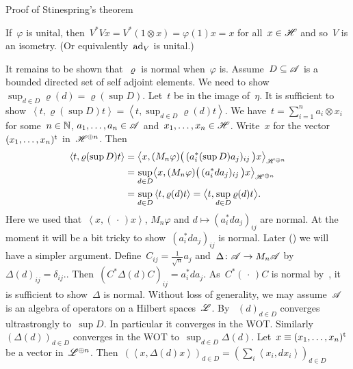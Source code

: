 \documentclass[b]{subfiles}
\begin{document}
\begin{parsec}
\begin{point}
\begin{point}{Proof of Stinespring's theorem }
\begin{point}
    If~$\varphi$ is unital,
    then~$V^*Vx = V^* (1\otimes x) = \varphi(1)x=x$
        for all~$x \in \mathscr{H}$ and so~$V$ is an isometry.
    (Or equivalently~$\mathrm{ad}_V$ is unital.)
\end{point}
\begin{point}%
    It remains to be shown that~$\varrho$
        is normal when~$\varphi$ is.
    Assume~$D \subseteq \mathscr{A}$ is a bounded directed
    set of self adjoint elements.
    We need to show~$\sup_{d \in D} \varrho (d) = \varrho(\sup D)$.
    Let~$t$ be in the image of~$\eta$.
    It is sufficient to show~$\left<t, \varrho(\sup D) t\right>
        = \left<t, \sup_{d \in D} \varrho(d)t\right>$.
    We have~$t = \sum_{i=1}^n a_i \otimes x_i$
        for some~$n \in \mathbb{N}$, $a_1, \ldots, a_n \in \mathscr{A}$
            and~$x_1,\ldots, x_n \in \mathscr{H}$.
    Write~$x$ for the vector~$(x_1, \ldots, x_n)^{\mathrm{t}}$
        in~$\mathscr{H}^{\oplus n}$.
    Then
    \begin{align*}
        \left<t, \varrho(\sup D) t\right>
        &= \bigl< x, (M_n\varphi)\bigl(\, ( a_i^* (\sup D) a_j)_{ij} \,\bigr) x \bigr>_{\mathscr{H}^{\oplus n}} \\
        &= \sup_{d\in D} \bigl< x, (M_n\varphi)\bigl(\, ( a_i^* d a_j)_{ij} \,\bigr) x \bigr>_{\mathscr{H}^{\oplus n}}\\
        & = \sup_{d\in D} \left<t, \varrho(d)t\right>
            = \bigl<t, \sup_{d \in D} \varrho(d) t\bigr>.
    \end{align*}
    Here we used that~$\left<x, (\,\cdot\,)x\right>$,
        $M_n\varphi$ and 
    $d \mapsto (a_i^*da_j)_{ij}$ are normal.
    \TODO{}
    At the moment it will be a bit tricky to show~$(a_i^*da_j)_{ij}$
    is normal.  Later (\TODO{}) we will have a simpler argument.
    Define~$C_{ij} = \frac{1}{\sqrt{n}} a_j$
        and~$\Delta\colon \mathscr{A} \to M_n \mathscr{A}$
        by~$\Delta(d)_{ij} = \delta_{ij}$..
    Then~$(C^*\Delta(d)C)_{ij} = a_i^* d a_j$.
    As~$C^*(\,\cdot\,)C$ is normal by~,
        it is sufficient to show~$\Delta$ is normal.
    Without loss of generality, we may assume~$\mathscr{A}$
        is an algebra of operators on a Hilbert spaces~$\mathscr{L}$.
        By~
        $(d)_{d \in D}$ converges ultrastrongly to~$\sup D$.
    In particular it converges in the WOT.
    Similarly
    $(\Delta(d))_{d \in D}$
        converges in the WOT
        to~$\sup_{d \in D} \Delta(d)$.
        Let~$x \equiv (x_1, \ldots, x_n)^{\mathrm{t}}$ be a vector in~$\mathscr{L}^{\oplus n}$.
        Then~$
        (\left<x,  \Delta(d)x\right>)_{d \in D}
        = (\sum_i \left<x_i,  dx_i \right>)_{d \in D}$

\end{point}
\end{point}
\end{point}
\end{parsec}
\end{document}
